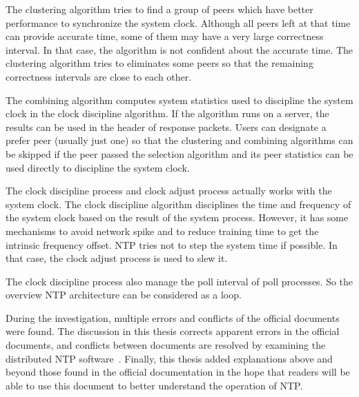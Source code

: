 The clustering algorithm tries to find a group of peers which have better
performance to synchronize the system clock. Although all peers left at that
time can provide accurate time, some of them may have a very large correctness
interval. In that case, the algorithm is not confident about the accurate time.
The clustering algorithm tries to eliminates some peers so that the remaining
correctness intervals are close to each other.

The combining algorithm computes system statistics used to discipline the system
clock in the clock discipline algorithm. If the algorithm runs on a server, the
results can be used in the header of response packets. Users can designate a
prefer peer (usually just one) so that the clustering and combining algorithms
can be skipped if the peer passed the selection algorithm and its peer
statistics can be used directly to discipline the system clock.

The clock discipline process and clock adjust process actually works with the
system clock. The clock discipline algorithm disciplines the time and frequency
of the system clock based on the result of the system process. However, it has some
mechanisms to avoid network spike and to reduce training time to get the intrinsic
frequency offset. NTP tries not to step the system time if possible. In that
case, the clock adjust process is used to slew it.

The clock discipline process also manage the poll interval of poll processes.
So the overview NTP architecture can be considered as a loop.

During the investigation, multiple errors and conflicts of the official
documents were found. The discussion in this thesis corrects apparent errors in
the official documents, and conflicts between documents are resolved by
examining the distributed NTP software~\cite{source_code}. 
Finally, this thesis added explanations above and beyond those found in the
official documentation in the hope that readers will be able to use this
document to better understand the operation of NTP.

